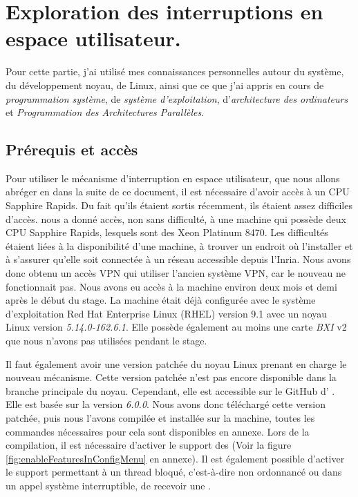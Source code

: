 \section{Exploration des interruptions en espace utilisateur.}
\label{sec:exploreUintr}

Pour cette partie, j'ai utilisé mes connaissances personnelles autour du système, du développement noyau, de Linux, ainsi que ce que j'ai appris en cours de \emph{programmation système}, de \emph{système d'exploitation}, d'\emph{architecture des ordinateurs} et \emph{Programmation des Architectures Parallèles}.

\subsection{Prérequis et accès}
\label{requirements}

Pour utiliser le mécanisme d'interruption en espace utilisateur, que nous allons abréger en \uintr{} dans la suite de ce document,
il est nécessaire d'avoir accès à un CPU \intel{} Sapphire Rapids.
Du fait qu'ils étaient sortis récemment, ils étaient assez difficiles d'accès.
\atos{} nous a donné accès, non sans difficulté, à une machine qui possède deux CPU \intel{} Sapphire Rapids, lesquels sont des \intel{} Xeon\textsuperscript{\tiny{\textregistered}} Platinum 8470.
Les difficultés étaient liées à la disponibilité d'une machine, à trouver un endroit où l'installer et à s'assurer qu'elle soit connectée à un réseau accessible depuis l'Inria.
Nous avons donc obtenu un accès VPN qui utiliser l'ancien système VPN, car le nouveau ne fonctionnait pas.
Nous avons eu accès à la machine environ deux mois et demi après le début du stage.
La machine était déjà configurée avec le système d'exploitation Red Hat Enterprise Linux (RHEL) version 9.1 avec un noyau Linux version \emph{5.14.0-162.6.1}.
Elle possède également au moins une carte \emph{BXI} v2 que nous n'avons pas utilisées pendant le stage. %

Il faut également avoir une version patchée du noyau Linux prenant en charge le nouveau mécanisme.
Cette version patchée n'est pas encore disponible dans la branche principale du noyau.
Cependant, elle est accessible sur le GitHub d'\intel{} \cite{intelUintrLinuxKernel}.
Elle est basée sur la version \emph{6.0.0}.
Nous avons donc téléchargé cette version patchée, puis nous l'avons compilée et installée sur la machine, toutes les commandes nécessaires pour cela sont disponibles en annexe.
Lors de la compilation, il est nécessaire d'activer le support des \uintr{} (Voir la figure \ref{fig:enableFeaturesInConfigMenu} en annexe).
Il est également possible d'activer le support permettant à un thread bloqué, c'est-à-dire non ordonnancé ou dans un appel système interruptible, de recevoir une \uintr{}.

